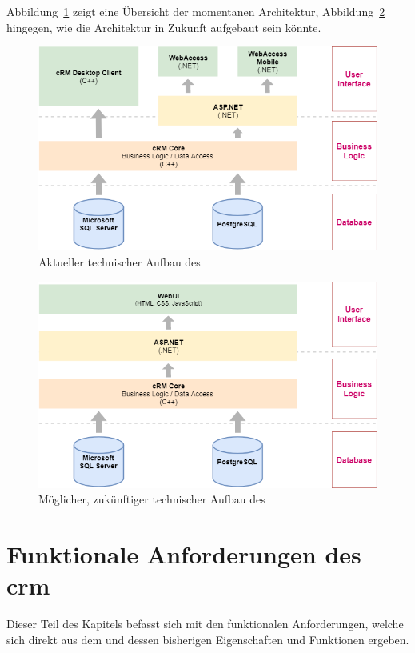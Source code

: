 Abbildung~\ref{fig:crm_technical_stack} zeigt eine Übersicht der momentanen Architektur, Abbildung~\ref{fig:crm_future_technical_stack} hingegen, wie die Architektur in Zukunft aufgebaut sein könnte.

\begin{figure}
    \centering
    \captionsetup{justification=centering}
    \includegraphics[width=\textwidth]{figures/crm_technical_stack.png}
        \caption{Aktueller technischer Aufbau des }\label{fig:crm_technical_stack}
\end{figure}

\begin{figure}
    \centering
    \captionsetup{justification=centering}
    \includegraphics[width=\textwidth]{figures/crm_future_technical_stack.png}
        \caption{Möglicher, zukünftiger technischer Aufbau des }\label{fig:crm_future_technical_stack}
\end{figure}


\section{Funktionale Anforderungen des \acrlong{crm}}
Dieser Teil des Kapitels befasst sich mit den funktionalen Anforderungen, welche sich direkt aus dem  und dessen bisherigen Eigenschaften und Funktionen ergeben.

